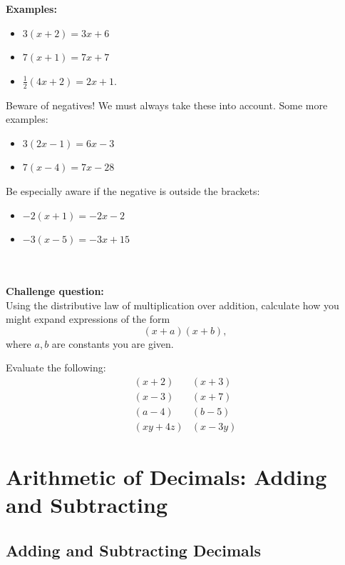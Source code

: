 \documentclass{article}
\begin{document}
\textbf{Examples:}

\begin{itemize}
    \item \(3(x+2) = 3x + 6\) 
    \item \(7(x+1) = 7x + 7\) 
    \item \(\frac{1}{2}(4x + 2) = 2x+1.\)
\end{itemize}

Beware of negatives! We must always take these into account. Some more examples:
\begin{itemize}
    \item \(3(2x-1) = 6x-3\)
    \item \(7(x-4) = 7x-28\)
\end{itemize}
Be especially aware if the negative is outside the brackets:
\begin{itemize}
    \item \(-2(x+1) = -2x-2 \)
    \item \(-3(x-5) = -3x + 15\)
\end{itemize}
\\
\\
\textbf{Challenge question:}
\\
Using the distributive law of multiplication over addition, calculate how you might expand expressions of the form
\[
(x+a)(x+b),
\]
where \(a,b\) are constants you are given.

Evaluate the following:
\begin{align*}
    (x+2)&(x+3)\\
    (x-3)&(x+7)\\
    (a-4)&(b-5)\\
    (xy+4z)&(x-3y)
\end{align*}


\newpage

\section{Arithmetic of Decimals: Adding and Subtracting}

\subsection{Adding and Subtracting Decimals}
\end{document}
